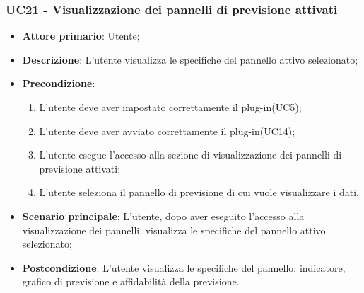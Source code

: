 \subsubsection{UC21 - Visualizzazione dei pannelli di previsione attivati}
\label{sssec:uc21}
\begin{itemize}
  \item \textbf{Attore primario}: Utente;
  \item \textbf{Descrizione}: L'utente visualizza le specifiche del pannello attivo selezionato;
  \item \textbf{Precondizione}:
  \begin{enumerate}
		\item L'utente deve aver impostato correttamente il plug-in(UC5);
		\item L'utente deve aver avviato correttamente il plug-in(UC14);
		\item L'utente esegue l'accesso alla sezione di visualizzazione dei pannelli di previsione attivati;
		\item L'utente seleziona il pannello di previsione di cui vuole visualizzare i dati.
	\end{enumerate}
  \item \textbf{Scenario principale}: L'utente, dopo aver eseguito l'accesso alla visualizzazione dei pannelli, visualizza le specifiche del pannello attivo selezionato;
  \item \textbf{Postcondizione}: L'utente visualizza le specifiche del pannello: indicatore, grafico di previsione e affidabilità della previsione.
\end{itemize}
